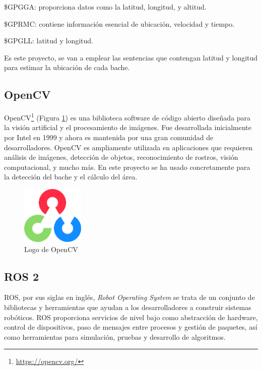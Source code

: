 \$GPGGA: proporciona datos como la latitud, longitud, y altitud.

\$GPRMC: contiene información esencial de ubicación, velocidad y tiempo.

\$GPGLL: latitud y longitud.

Es este proyecto, se van a emplear las sentencias que contengan latitud y longitud para estimar la ubicación de cada bache.

\subsection{OpenCV}

OpenCV\footnote{\url{https://opencv.org/}} (Figura \ref{fig:opencv}) es una biblioteca software de código abierto diseñada para la visión artificial y el procesamiento de imágenes. Fue desarrollada inicialmente por Intel en 1999 y ahora es mantenida por una gran comunidad de desarrolladores. OpenCV es ampliamente utilizada en aplicaciones que requieren análisis de imágenes, detección de objetos, reconocimiento de rostros, visión computacional, y mucho más. En este proyecto se ha usado concretamente para la detección del bache y el cálculo del área.

\begin{figure} [h!]
	\begin{center}
		\includegraphics[width=3cm]{figs/opencv.png}
	\end{center}
	\caption{Logo de OpenCV} %
	\label{fig:opencv}
\end{figure}


\subsection{ROS 2}

ROS, por sus siglas en inglés, \textit{Robot Operating System} se trata de un conjunto de bibliotecas y herramientas que ayudan a los desarrolladores a construir sistemas robóticos. ROS proporciona servicios de nivel bajo como abstracción de hardware, control de dispositivos, paso de mensajes entre procesos y gestión de paquetes, así como herramientas para simulación, pruebas y desarrollo de algoritmos.

